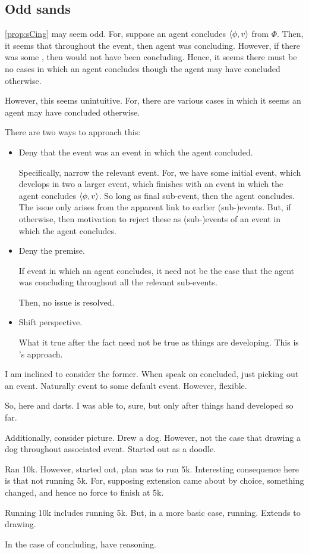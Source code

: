 \subsection{Odd sands}

\begin{note}
  \autoref{prop:sCing} may seem odd.
  For, suppose an agent concludes \(\langle \phi, v \rangle\) from \(\Phi\).
  Then, it seems that throughout the event, then agent was concluding.
  However, if there was some \curb{}, then would not have been concluding.
  Hence, it seems there must be no cases in which an agent concludes though the agent may have concluded otherwise.

  However, this seems unintuitive.
  For, there are various cases in which it seems an agent may have concluded otherwise.

  There are two ways to approach this:
  \begin{itemize}
  \item
    Deny that the event was an event in which the agent concluded.

    Specifically, narrow the relevant event.
    For, we have some initial event, which develops in two a larger event, which finishes with an event in which the agent concludes \(\langle \phi, v \rangle\).
    So long as final sub-event, then the agent concludes.
    The issue only arises from the apparent link to earlier (sub-)events.
    But, if otherwise, then motivation to reject these as (sub-)events of an event in which the agent concludes.
  \item
    Deny the premise.

    If event in which an agent concludes, it need not be the case that the agent was concluding throughout all the relevant sub-events.

    Then, no issue is resolved.
  \item
    Shift perspective.

    What it true after the fact need not be true as things are developing.
    This is \citeauthor{Boylan:2020aa}'s approach.
  \end{itemize}

  I am inclined to consider the former.
  When speak on concluded, just picking out an event.
  Naturally event to some default event.
  However, flexible.

  So, here \citeauthor{Boylan:2020aa} and darts.
  I was able to, sure, but only after things hand developed so far.

  Additionally, consider picture.
  Drew a dog.
  However, not the case that drawing a dog throughout associated event.
  Started out as a doodle.

  Ran 10k.
  However, started out, plan was to run 5k.
  Interesting consequence here is that not running 5k.
  For, supposing extension came about by choice, something changed, and hence no force to finish at 5k.

  Running 10k includes running 5k.
  But, in a more basic case, running.
  Extends to drawing.

  In the case of concluding, have reasoning.
\end{note}

